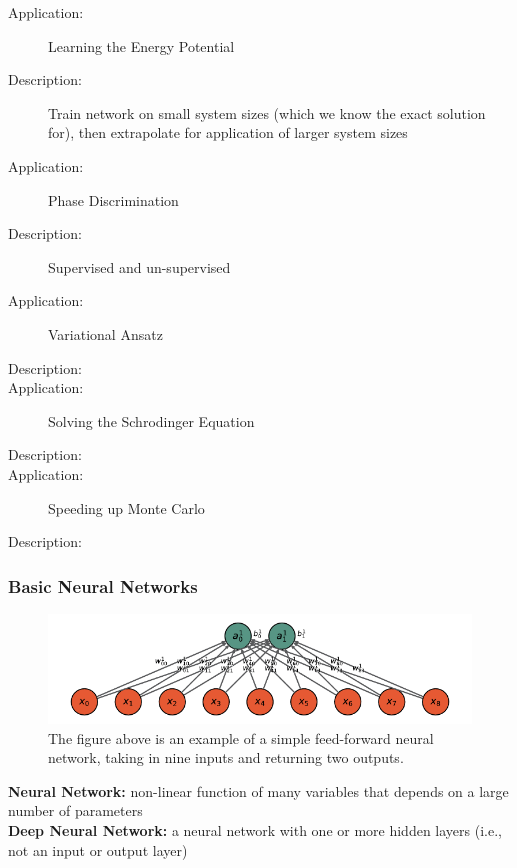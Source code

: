 \begin{description}
\item [Application:] Learning the Energy Potential
\item [Description:] Train network on small system sizes (which we know the exact solution for), then extrapolate for application of larger system sizes 

\item [Application:] Phase Discrimination
\item [Description:] Supervised and un-supervised 

\item[Application:] Variational Ansatz 
\item[Description:] 

\item [Application:] Solving the Schrodinger Equation
\item[Description:] 

\item [Application:] Speeding up Monte Carlo
\item [Description:] 
\end{description}

\subsubsection{Basic Neural Networks}

\begin{figure}[H]
\centering
\includegraphics{../figures/neural_network.pdf}
\caption{The figure above is an example of a simple feed-forward neural network, taking in nine inputs and returning two outputs.}
\end{figure}

\noindent \textbf{Neural Network:} non-linear function of many variables that depends on a large number of parameters \\
\textbf{Deep Neural Network:} a neural network with one or more hidden layers (i.e., not an input or output layer)

